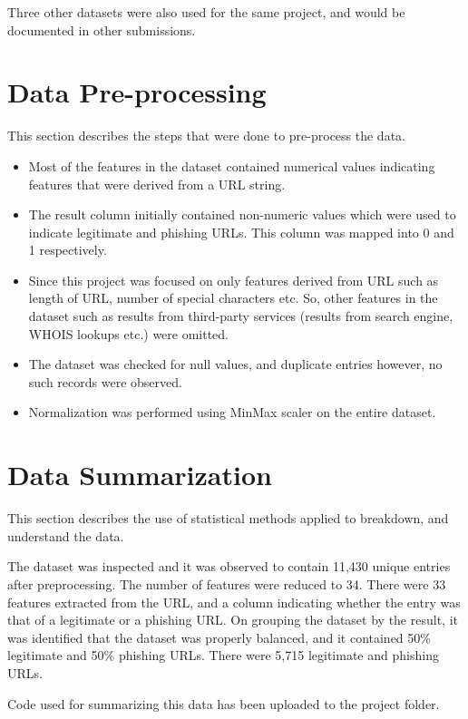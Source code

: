 \documentclass[letterpaper, 28pt, fleqn]{article}
\begin{document}
\begin{multicols}{2}
Three other datasets were also used for the same project, and would be documented in other submissions.

\section{Data Pre-processing}

This section describes the steps that were done to pre-process the data. 


\begin{itemize}
    \item Most of the features in the dataset contained numerical values indicating features that were derived from a URL string. 
\item The result column initially contained non-numeric values which were used to indicate legitimate and phishing URLs. This column was mapped into 0 and 1 respectively. 
\item Since this project was focused on only features derived from URL such as length of URL, number of special characters etc. So, other features in the dataset such as results from third-party services (results from search engine, WHOIS lookups etc.) were omitted.
\item The dataset was checked for null values, and duplicate entries however, no such records were observed.
\item Normalization was performed using MinMax scaler on the entire dataset. 
\end{itemize}



\section{Data Summarization}

This section describes the use of statistical methods applied to breakdown, and understand the data.

The dataset was inspected and it was observed to contain 11,430 unique entries after preprocessing. The number of features were reduced to 34. There were 33 features extracted from the URL, and a column indicating whether the entry was that of a legitimate or a phishing URL. 
On grouping the dataset by the result, it was identified that the dataset was properly balanced, and it contained 50\% legitimate and 50\% phishing URLs. There were 5,715 legitimate and phishing URLs. 

Code used for summarizing this data has been uploaded to the project folder.


\end{multicols}
\end{document}

